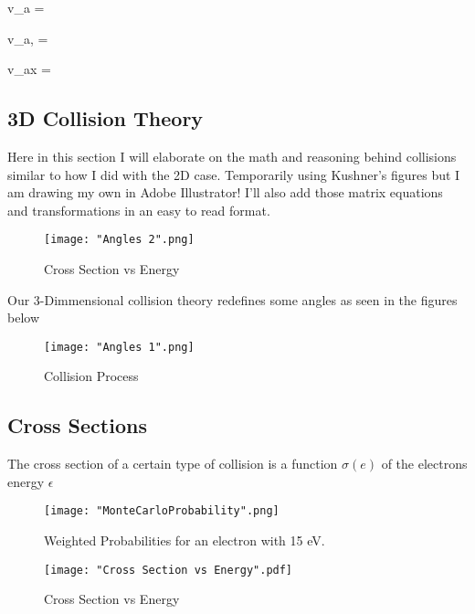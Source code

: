 \documentclass[12pt]{article}
\begin{document}
\beqn
v_{a}  =   
\label{va}
\eeqn

\beqn
v_{a,}  =     
\label{vaInelastic}
\eeqn

\beqn
v_{ax}  = 
\label{vax}
\eeqn


\subsection{3D Collision Theory}

Here in this section I will elaborate on the math and reasoning behind collisions similar to how I did with the 2D case. Temporarily using Kushner's figures but I am drawing my own in Adobe Illustrator! I'll also add those matrix equations and transformations in an easy to read format.

\begin{figure}[H]
	\centering
	\texttt{[image: "Angles 2".png]}
	\caption{Cross Section vs Energy}
	\label{Collision in Rotated Coordinate System}
\end{figure}

Our 3-Dimmensional collision theory redefines some angles as seen in the figures below
\begin{figure}[H]
	\centering
	\texttt{[image: "Angles 1".png]}
	\caption{Collision Process}
	\label{3D Collision Process}
\end{figure}




\subsection{Cross Sections}

The cross section of a certain type of collision is a function $\sigma(e)$ of the electrons energy $\epsilon$

\begin{figure}[H]
	\centering
	\texttt{[image: "MonteCarloProbability".png]}
	\caption{Weighted Probabilities for an electron with 15 eV.}
	\label{Weighted Probability}
\end{figure}

\begin{figure}
	\centering
	\texttt{[image: "Cross Section vs Energy".pdf]}
	\caption{Cross Section vs Energy}
	\label{fig:right}
\end{figure}
\end{document}
